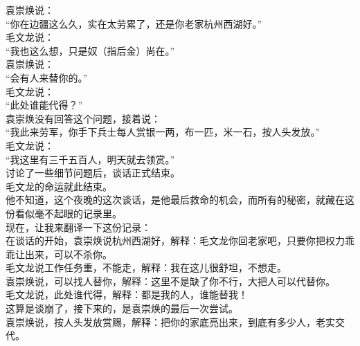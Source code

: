 \begin{multicols}{\theparacolNo}
袁崇焕说：\\

“你在边疆这么久，实在太劳累了，还是你老家杭州西湖好。”\\

毛文龙说：\\

“我也这么想，只是奴（指后金）尚在。”\\

袁崇焕说：\\

“会有人来替你的。”\\

毛文龙说：\\

“此处谁能代得？”\\

袁崇焕没有回答这个问题，接着说：\\

“我此来劳军，你手下兵士每人赏银一两，布一匹，米一石，按人头发放。”\\

毛文龙说：\\

“我这里有三千五百人，明天就去领赏。”\\

讨论了一些细节问题后，谈话正式结束。\\

毛文龙的命运就此结束。\\

他不知道，这个夜晚的这次谈话，是他最后救命的机会，而所有的秘密，就藏在这份看似毫不起眼的记录里。\\

现在，让我来翻译一下这份记录：\\

在谈话的开始，袁崇焕说杭州西湖好，解释：毛文龙你回老家吧，只要你把权力乖乖让出来，可以不杀你。\\

毛文龙说工作任务重，不能走，解释：我在这儿很舒坦，不想走。\\

袁崇焕说，可以找人替你，解释：这里不是缺了你不行，大把人可以代替你。\\

毛文龙说，此处谁代得，解释：都是我的人，谁能替我！\\

这算是谈崩了，接下来的，是袁崇焕的最后一次尝试。\\

袁崇焕说，按人头发放赏赐，解释：把你的家底亮出来，到底有多少人，老实交代。\\


\end{multicols}

